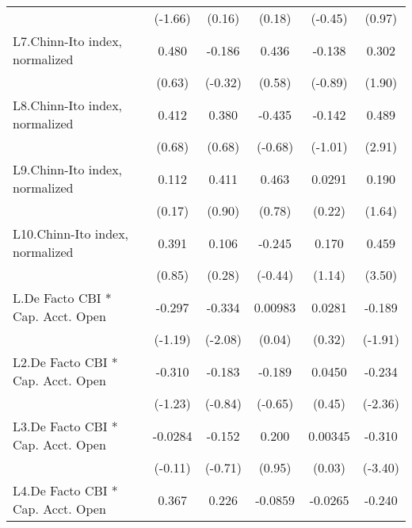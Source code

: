 {\begin{longtable}{l*{5}{c}}
                &  (-1.66)         &   (0.16)         &   (0.18)         &  (-0.45)         &   (0.97)         \\
[1em]
L7.Chinn-Ito index, normalized&    0.480         &   -0.186         &    0.436         &   -0.138         &    0.302         \\
                &   (0.63)         &  (-0.32)         &   (0.58)         &  (-0.89)         &   (1.90)         \\
[1em]
L8.Chinn-Ito index, normalized&    0.412         &    0.380         &   -0.435         &   -0.142         &    0.489\sym{**} \\
                &   (0.68)         &   (0.68)         &  (-0.68)         &  (-1.01)         &   (2.91)         \\
[1em]
L9.Chinn-Ito index, normalized&    0.112         &    0.411         &    0.463         &   0.0291         &    0.190         \\
                &   (0.17)         &   (0.90)         &   (0.78)         &   (0.22)         &   (1.64)         \\
[1em]
L10.Chinn-Ito index, normalized&    0.391         &    0.106         &   -0.245         &    0.170         &    0.459\sym{***}\\
                &   (0.85)         &   (0.28)         &  (-0.44)         &   (1.14)         &   (3.50)         \\
[1em]
L.De Facto CBI * Cap. Acct. Open&   -0.297         &   -0.334\sym{*}  &  0.00983         &   0.0281         &   -0.189         \\
                &  (-1.19)         &  (-2.08)         &   (0.04)         &   (0.32)         &  (-1.91)         \\
[1em]
L2.De Facto CBI * Cap. Acct. Open&   -0.310         &   -0.183         &   -0.189         &   0.0450         &   -0.234\sym{*}  \\
                &  (-1.23)         &  (-0.84)         &  (-0.65)         &   (0.45)         &  (-2.36)         \\
[1em]
L3.De Facto CBI * Cap. Acct. Open&  -0.0284         &   -0.152         &    0.200         &  0.00345         &   -0.310\sym{***}\\
                &  (-0.11)         &  (-0.71)         &   (0.95)         &   (0.03)         &  (-3.40)         \\
[1em]
L4.De Facto CBI * Cap. Acct. Open&    0.367         &    0.226         &  -0.0859         &  -0.0265         &   -0.240\sym{*}  \\

\end{longtable}}
